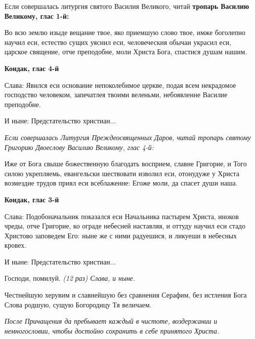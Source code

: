 \itshape 


Если совершалась литургия святого Василия Великого, читай\normalfont{} \bfseries тропарь Василию Великому, глас 1-й:\normalfont{}


Во всю землю изыде вещание твое, яко приемшую слово твое, имже боголепно научил еси, естество сущих уяснил еси, человеческия обычаи украсил еси, царское священие, отче преподобне, моли Христа Бога, спастися душам нашим.


\medskip
\bfseries Кондак, глас 4-й\normalfont{}\nopagebreak


Слава: Явился еси основание непоколебимое церкве, подая всем некрадомое господство человеком, запечатлея твоими веленьми, небоявленне Василие преподобне.

И ныне: Предстательство христиан...


\itshape Если совершалась Литургия Преждеосвященных Даров, читай тропарь святому Григорию Двоеслову Василию  Великому, глас 4-й:\normalfont{}

Иже от Бога свыше божественную благодать восприем, славне Григорие, и Того силою укрепляемь, евангельски шествовати изволил еси, отонудуже у Христа возмездие трудов приял еси всеблаженне: Егоже моли, да спасет души наша.  

\bfseries Кондак, глас 3-й\normalfont{}\nopagebreak


Слава: Подобоначальник показался еси Начальника пастырем Христа, иноков чреды, отче Григорие, ко ограде небесней наставляя, и оттуду научил еси стадо Христово заповедем Его: ныне же с ними радуешися, и ликуеши в небесных кровех.


И ныне: Предстательство христиан...


Господи, помилуй. \itshape (12 раз)\normalfont{} Слава, и ныне.


Честнейшую херувим и славнейшую без сравнения Серафим, без истления Бога Слова родшую, сущую Богородицу Тя величаем.

\itshape После Причащения да пребывает каждый в чистоте, воздержании и немногословии, чтобы достойно сохранить в себе принятого Христа.\normalfont{}\mychapterending
